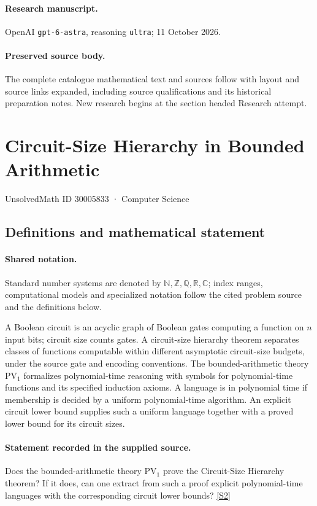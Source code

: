 \documentclass[11pt]{article}
\begin{document}
\paragraph{Research manuscript.} OpenAI \texttt{gpt-6-astra}, reasoning \texttt{ultra}; 11 October 2026.
\paragraph{Preserved source body.} The complete catalogue mathematical text and sources follow with layout and source links expanded, including source qualifications and its historical preparation notes. New research begins at the section headed Research attempt.

\section{Circuit-Size Hierarchy in Bounded Arithmetic}\label{30005833}
{\small UnsolvedMath ID 30005833 · Computer Science}
\subsection{Definitions and mathematical statement}

\paragraph{Shared notation.}Standard number systems are denoted by $\mathbb N,\mathbb Z,\mathbb Q,\mathbb R,\mathbb C$; index ranges, computational models and specialized notation follow the cited problem source and the definitions below.


A Boolean circuit is an acyclic graph of Boolean gates computing a function on $n$ input bits; circuit size counts gates. A circuit-size hierarchy theorem separates classes of functions computable within different asymptotic circuit-size budgets, under the source gate and encoding conventions. The bounded-arithmetic theory $\mathrm{PV}_1$ formalizes polynomial-time reasoning with symbols for polynomial-time functions and its specified induction axioms. A language is in polynomial time if membership is decided by a uniform polynomial-time algorithm. An explicit circuit lower bound supplies such a uniform language together with a proved lower bound for its circuit sizes.
\paragraph{Statement recorded in the supplied source.}
Does the bounded-arithmetic theory $\mathrm{PV}_1$ prove the Circuit-Size Hierarchy theorem? If it does, can one extract from such a proof explicit polynomial-time languages with the corresponding circuit lower bounds? \href{https://doi.org/10.4171/owr/2024/15}{[S2]}
\end{document}
